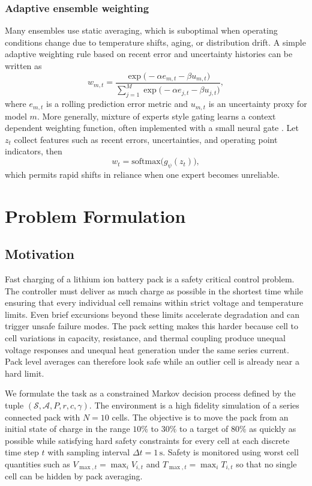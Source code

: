 \documentclass[%
 aip,
 amsmath,amssymb,
reprint, onecolumn %
]{revtex4-1}
\begin{document}
\subsubsection{Adaptive ensemble weighting}
Many ensembles use static averaging, which is suboptimal when operating conditions change due to temperature shifts, aging, or distribution drift. A simple adaptive weighting rule based on recent error and uncertainty histories can be written as
\begin{equation}
w_{m,t}=\frac{\exp\bigl(-\alpha e_{m,t}-\beta u_{m,t}\bigr)}{\sum_{j=1}^{M}\exp\bigl(-\alpha e_{j,t}-\beta u_{j,t}\bigr)},
\label{eq_softmax_weighting}
\end{equation}
where $e_{m,t}$ is a rolling prediction error metric and $u_{m,t}$ is an uncertainty proxy for model $m$. More generally, mixture of experts style gating learns a context dependent weighting function, often implemented with a small neural gate \cite{shazeer2017outrageously}. Let $z_t$ collect features such as recent errors, uncertainties, and operating point indicators, then
\begin{equation}
w_t=\mathrm{softmax}\bigl(g_{\psi}(z_t)\bigr),
\label{eq_gate_softmax}
\end{equation}
which permits rapid shifts in reliance when one expert becomes unreliable.

\section{Problem Formulation}

\subsection{Motivation}
Fast charging of a lithium ion battery pack is a safety critical control problem. The controller must deliver as much charge as possible in the shortest time while ensuring that every individual cell remains within strict voltage and temperature limits. Even brief excursions beyond these limits accelerate degradation and can trigger unsafe failure modes. The pack setting makes this harder because cell to cell variations in capacity, resistance, and thermal coupling produce unequal voltage responses and unequal heat generation under the same series current. Pack level averages can therefore look safe while an outlier cell is already near a hard limit.

We formulate the task as a constrained Markov decision process defined by the tuple $(\mathcal{S}, \mathcal{A}, P, r, c, \gamma)$. The environment is a high fidelity simulation of a series connected pack with $N=10$ cells. The objective is to move the pack from an initial state of charge in the range $10\%$ to $30\%$ to a target of $80\%$ as quickly as possible while satisfying hard safety constraints for every cell at each discrete time step $t$ with sampling interval $\Delta t = 1\,\mathrm{s}$. Safety is monitored using worst cell quantities such as $V_{\max,t}=\max_i V_{i,t}$ and $T_{\max,t}=\max_i T_{i,t}$ so that no single cell can be hidden by pack averaging.
\end{document}
